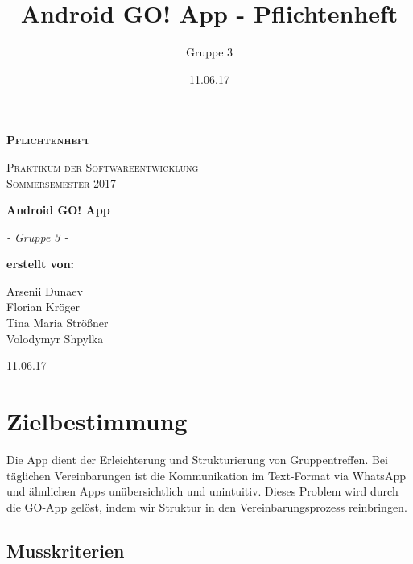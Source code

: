 \documentclass[parskip=full]{scrartcl}
\title{Android GO! App - Pflichtenheft}
\author{Gruppe 3}
\date{11.06.17}
\begin{document}
\begin{titlepage}
	\begin{center}
	{\scshape\LARGE \bfseries Pflichtenheft \par}
	\vspace{1cm}
	{\scshape\Large Praktikum der Softwareentwicklung \\ Sommersemester 2017\par}
	\vspace{1.5cm}
	{\huge\bfseries Android GO! App\par}
	\vspace{2cm}
	{\Large\itshape - Gruppe 3 -\par}
	\vfill
	{\bfseries erstellt von:\par}
	Arsenii Dunaev \\
	Florian Kröger \\
	Tina Maria Strößner \\
	Volodymyr Shpylka \\	
	\vfill
	{\large 11.06.17 \par}	
	\end{center}
\end{titlepage}

\tableofcontents

\newpage
\section{Zielbestimmung}
Die \gls{App} dient der Erleichterung und Strukturierung von Gruppentreffen. 
 Bei täglichen Vereinbarungen ist die Kommunikation im Text-Format via WhatsApp und ähnlichen Apps unübersichtlich und unintuitiv. 
Dieses Problem wird durch die GO-App gelöst, indem wir Struktur in den Vereinbarungsprozess reinbringen.  
\subsection{Musskriterien}
\end{document}
